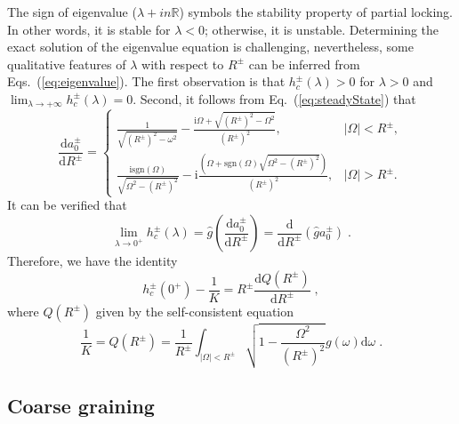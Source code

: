 \documentclass{article}
\begin{document}
The sign of eigenvalue ($\lambda+in \mathbb{R}$) symbols the stability property of partial locking. In other words, it is stable for $\lambda<0$; otherwise, it is unstable. Determining the exact solution of the eigenvalue equation is challenging, nevertheless, some qualitative features of $\lambda$ with respect to $R^{\pm}$ can be inferred from Eqs.~(\ref{eq:eigenvalue}). The first observation is that $h_c^{\pm}(\lambda) > 0$ for $\lambda > 0$ and $\lim_{\lambda \rightarrow +\infty} h_{c}^{\pm}\left( \lambda \right) =0$. Second, it follows from Eq.~(\ref{eq:steadyState}) that
{
\small
\begin{equation}
    \frac{\mathrm{d} a_{0}^{\pm}}{\mathrm{d}R^{\pm}}=\begin{cases}
        \frac{1}{\sqrt{\left( R^{\pm} \right) ^2-\omega ^2}}-\frac{\mathrm{i}\Omega +\sqrt{\left( R^{\pm} \right) ^2-\Omega ^2}}{\left( R^{\pm} \right) ^2},&		|\Omega |<R^{\pm},\\
        \frac{\mathrm{i}\text{sgn}\left(\Omega \right)}{\sqrt{\Omega ^2-\left( R^{\pm} \right) ^2}}-\mathrm{i}\frac{(\Omega +\text{sgn}\left(\Omega \right)\sqrt{\Omega ^2-\left( R^{\pm} \right) ^2})}{\left( R^{\pm} \right) ^2},&		|\Omega |>R^{\pm}.
    \end{cases}
\end{equation} 
}
It can be verified that
\begin{equation}
    \lim_{\lambda \rightarrow 0^+} h_{c}^{\pm}\left( \lambda \right)=\hat{g}\left( \frac{\mathrm{d}a_{0}^{\pm}}{\mathrm{d}R^{\pm}} \right) =\frac{\mathrm{d}}{\mathrm{d}R^{\pm}}\left( \hat{g}a_{0}^{\pm} \right) \;.
\end{equation}
Therefore, we have the identity
\begin{equation}
    h_{c}^{\pm}\left( 0^+ \right) -\frac{1}{K}=R^{\pm}\frac{\mathrm{d}Q\left( R^{\pm} \right)}{\mathrm{d}R^{\pm}}\;,
\end{equation}
where $Q\left( R^{\pm} \right)$ given by the self-consistent equation
\begin{equation}
    \frac{1}{K}=Q\left( R^{\pm} \right) =\frac{1}{R^{\pm}}\int_{\left| \Omega \right|<R^{\pm}}{\sqrt{1-\frac{\Omega ^2}{\left( R^{\pm} \right) ^2}}g\left( \omega \right) \mathrm{d}\omega}\;.
\end{equation}

\subsection{\label{sec:analysis}Coarse graining}
\end{document}
